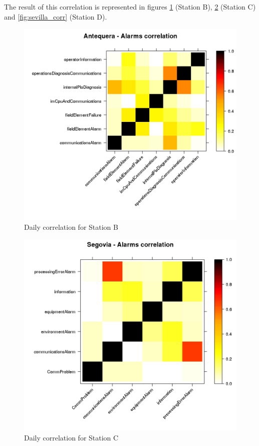 The result of this correlation is represented in figures \ref{fig:anteq_corr} (Station B), \ref{fig:segovia_corr} (Station C) and \ref{fig:sevilla_corr} (Station D).

\begin{figure}[htb]
 \centering
 \includegraphics[width=\textwidth]{./img/antequera_corr.png}
 \caption{Daily correlation for Station B} \label{fig:anteq_corr}
\end{figure}
\begin{figure}[htb]
 \centering
 \includegraphics[width=\textwidth]{./img/segovia_corr.png}
 \caption{Daily correlation for Station C} \label{fig:segovia_corr}
\end{figure}
